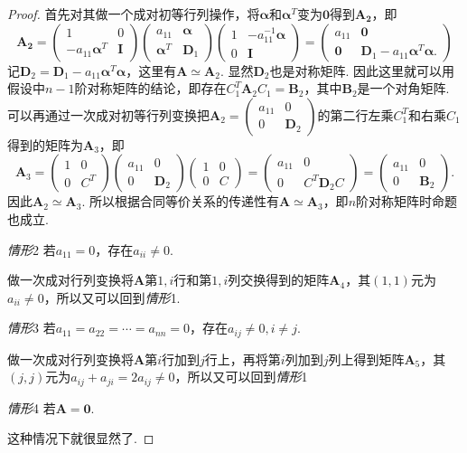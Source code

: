 \documentclass{article}
\newcommand{\mbf}[1]{\bm{#1}}
\begin{document}
\begin{proof}
首先对其做一个成对初等行列操作，将$\mbf{\alpha}$和$\mbf{\alpha}^T$变为$\mbf{0}$得到$\mbf{A_2}$，即
$$
\mbf{A_2} =
\begin{pmatrix}
1 & 0 \\
-a_{11}\mbf{\alpha}^T & \mbf{I}
\end{pmatrix}
\begin{pmatrix}
a_{11} & \mbf{\alpha}\\
\mbf{\alpha}^T & \mbf{D}_1
\end{pmatrix} 
\begin{pmatrix}
1 & -a_{11}^{-1}\mbf{\alpha} \\
0 & \mbf{I}
\end{pmatrix}
= \begin{pmatrix}
a_{11}  & \mbf{0} \\
\mbf{0} & \mbf{D}_1-a_{11}\mbf{\alpha}^T\mbf{\alpha}.
\end{pmatrix}
$$
记$\mbf{D}_2 =  \mbf{D}_1-a_{11}\mbf{\alpha}^T\mbf{\alpha}$，这里有$\mbf{A} \simeq \mbf{A}_2$. 显然$\mbf{D}_2$也是对称矩阵. 因此这里就可以用假设中$n-1$阶对称矩阵的结论，即存在$C_1^T\mbf{A}_2C_1 = \mbf{B}_2$，其中$\mbf{B}_2$是一个对角矩阵. 可以再通过一次成对初等行列变换把$\mbf{A}_2 = \begin{pmatrix}
a_{11} & 0 \\
0 & \mbf{D}_2
\end{pmatrix}$的第二行左乘$C_1^{T}$和右乘$C_1$得到的矩阵为$\mbf{A}_3$，即
$$
\mbf{A}_3 =
\begin{pmatrix}
1 & 0 \\
0 & C^T 
\end{pmatrix}
\begin{pmatrix}
a_{11} & 0 \\
0 & \mbf{D}_2
\end{pmatrix}
\begin{pmatrix}
1 & 0 \\
0 & C 
\end{pmatrix} =
\begin{pmatrix}
a_{11} & 0 \\
0 & C^T\mbf{D}_2C 
\end{pmatrix} =
\begin{pmatrix}
a_{11} & 0 \\
0 & \mbf{B}_2 
\end{pmatrix}.
$$
因此$\mbf{A}_2 \simeq \mbf{A}_3$. 所以根据合同等价关系的传递性有$\mbf{A} \simeq \mbf{A}_3$，即$n$阶对称矩阵时命题也成立. 

\emph{情形}2 若$a_{11} = 0$，存在$a_{ii} \neq 0$. 

做一次成对行列变换将$\mbf{A}$第$1,i$行和第$1,i$列交换得到的矩阵$\mbf{A}_4$，其$(1,1)$元为$a_{ii} \neq 0$，所以又可以回到\emph{情形}1.

\emph{情形}3 若$a_{11} = a_{22} = \cdots = a_{nn} = 0$，存在$a_{ij} \neq 0, i \neq j$. 

做一次成对行列变换将$\mbf{A}$第$i$行加到$j$行上，再将第$i$列加到$j$列上得到矩阵$\mbf{A}_5$，其$(j,j)$元为$a_{ij} + a_{ji} = 2a_{ij} \neq 0$，所以又可以回到\emph{情形}1

\emph{情形}4 若$\mbf{A} = \mbf{0}$.

这种情况下就很显然了. 
\end{proof}
\end{document}
